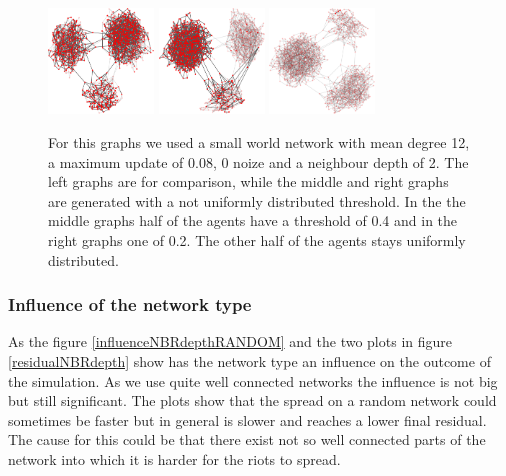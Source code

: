 \begin{figure}
\includegraphics[width=0.25\textwidth]{batchRun__kHalf=2-2-2_maxUpdate=0.08_noize=0_nbrDepth=2/network1000-crop.pdf}
\hfill
\includegraphics[width=0.25\textwidth]{batchRun__kHalf=2-2-2_maxUpdate=0.08_noize=0_nbrDepth=2_fixedthreshold=0.4/network1000-crop.pdf}
\hfill
\includegraphics[width=0.25\textwidth]{batchRun__kHalf=2-2-2_maxUpdate=0.08_noize=0_nbrDepth=2_fixedthreshold=0.2/network1000-crop.pdf}

\caption{For this graphs we used a small world network with mean degree 12, a
  maximum update of 0.08, 0 noize and a neighbour depth of 2. The left graphs
  are for comparison, while the middle and right graphs are generated with a
  not uniformly distributed threshold. In the the middle graphs half of the
  agents have a threshold of 0.4 and in the right graphs one of 0.2. The other
  half of the agents stays uniformly distributed.}
\label{influencethresholdnetwork}
\end{figure}

\subsubsection{Influence of the network type}
\label{sec:influencenetworktype}
As the figure \ref{influenceNBRdepthRANDOM} and the two plots in figure
\ref{residualNBRdepth} show has the network type an influence on the outcome of
the simulation. As we use quite well connected networks the influence is not
big but still significant. The plots show that the spread on a random network
could sometimes be faster but in general is slower and reaches a lower final
residual. The cause for this could be that there exist not so well connected
parts of the network into which it is harder for the riots to spread.


